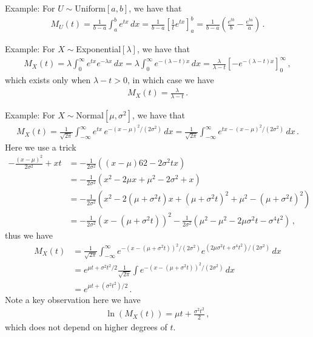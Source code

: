 \documentclass[11pt, onesided]{book}
\theoremstyle{break}
\theoremstyle{break}
\newcommand{\example}{\color{green}Example: \color{black}}
\begin{document}
\example For $U \sim $Uniform$[a,b]$, we have that
\begin{align*}
M_U(t) = \frac{1}{b-a} \int_a^b e^{tx}\,dx = \frac{1}{b-a}\left[ \frac{1}{t}e^{tx}\right]_a^b = \frac{1}{b-a}\left( \frac{e^{tb}}{b} - \frac{e^{ta}}{a}\right)\,.
\end{align*}

\example For $X\sim$Exponential$[\lambda]$, we have that
\begin{align*}
M_X(t) = \lambda\int_0^\infty e^{tx} e^{-\lambda x}\, dx = \lambda \int_0^\infty e^{-(\lambda -t)x}\, dx = \frac{\lambda}{\lambda -t}\left[-e^{-(\lambda -t)x}\right]^\infty_0\,,
\end{align*}
which exists only when $\lambda - t > 0$, in which case we have
\begin{align*}
M_X(t) = \frac{\lambda}{\lambda -t}\,.
\end{align*}


\example For $X \sim $Normal$[\mu, \sigma^2]$, we have that
\begin{align*}
M_X(t) = \frac{1}{\sqrt{2\pi}}\int_{-\infty}^\infty e^{tx}\, e^{-(x-\mu)^2/(2\sigma^2)}\, dx = \frac{1}{\sqrt{2\pi}}\int_{-\infty}^\infty e^{tx - (x-\mu)^2/(2\sigma^2)}\, dx\,.
\end{align*}
Here we use a trick
\begin{align*}
-\frac{(x-\mu)^2}{2\sigma^2} + xt &= -\frac{1}{2\sigma^2}\left( (x-\mu)62 - 2\sigma^2 tx\right) \\
&= -\frac{1}{2\sigma^2}\left( x^2 - 2\mu x + \mu^2 - 2\sigma^2 + x\right)\\
&= -\frac{1}{2\sigma^2}\left( x^2 - 2(\mu + \sigma^2 t)x + (\mu + \sigma^2 t)^2 + \mu^2 - (\mu+ \sigma^2 t)^2\right)\\
&= -\frac{1}{2\sigma^2} \left(x - (\mu + \sigma^2 t)\right)^2 - \frac{1}{2\sigma^2}\left( \mu^2 - \mu^2 - 2\mu \sigma^2 t- \sigma^4 t^2\right)\,,
\end{align*}
thus we have
\begin{align*}
M_X(t) &= \frac{1}{\sqrt{2\pi}}\int_{-\infty}^\infty e^{-(x-(\mu + \sigma^2 t))^2/(2\sigma^2)}e^{(2\mu \sigma^2 t + \sigma^4 t^2)/(2\sigma^2)}\, dx\\
&=e^{\mu t + \sigma^2 t^2/2} \frac{1}{\sqrt{2\pi}} \int e^{-(x-(\mu + \sigma^2 t))^2/(2\sigma^2)}\, dx\\
&= e^{\mu t + (\sigma^2 t^2)/2}\,.
\end{align*}
Note a key observation here we have
\begin{align*}
\ln\left( M_X(t) \right)= \mu t + \frac{\sigma^2t^2}{2}\,,
\end{align*}
which does not depend on higher degrees of $t$. \\
\end{document}
